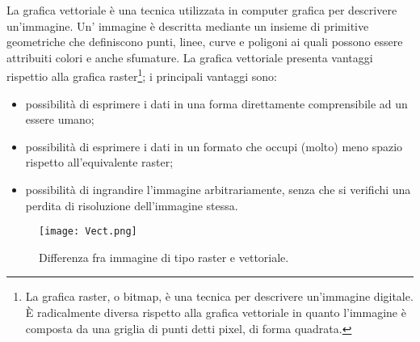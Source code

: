 La grafica vettoriale \`e una tecnica utilizzata in computer grafica per descrivere 
un'immagine. 
Un' immagine \`e descritta mediante un insieme di primitive geometriche che definiscono punti, linee, curve e poligoni ai quali possono essere attribuiti colori e anche sfumature. La grafica vettoriale presenta  vantaggi rispettio alla grafica raster\footnote{La grafica raster, o bitmap, \`e una tecnica per descrivere un'immagine digitale. \`E radicalmente diversa rispetto alla grafica vettoriale in quanto l’immagine \`e composta da una griglia di punti detti pixel, di forma quadrata.}; i principali vantaggi sono:
\begin{itemize}
\item possibilit\`a di esprimere i dati in una forma direttamente comprensibile ad un essere umano;
\item possibilit\`a di esprimere i dati in un formato che occupi (molto) meno spazio rispetto all'equivalente raster;
\item possibilit\`a di ingrandire l'immagine arbitrariamente, senza che si verifichi una perdita di risoluzione dell'immagine stessa.
\end{itemize}
\begin{figure}[!htb]
\centering%
\texttt{[image: Vect.png]}%
\caption{Differenza fra immagine di tipo raster e vettoriale.}\label{fig:imgVet}%
\end{figure}
